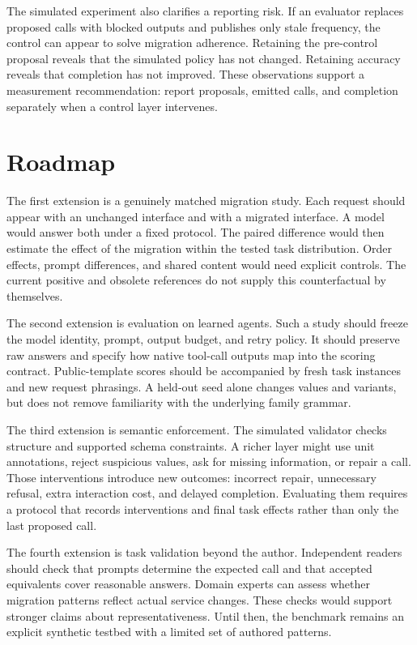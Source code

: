 \documentclass{article}
\begin{document}
The simulated experiment also clarifies a reporting risk. If an evaluator replaces proposed calls with blocked outputs and publishes only stale frequency, the control can appear to solve migration adherence. Retaining the pre-control proposal reveals that the simulated policy has not changed. Retaining accuracy reveals that completion has not improved. These observations support a measurement recommendation: report proposals, emitted calls, and completion separately when a control layer intervenes.\par
\section{Roadmap}
The first extension is a genuinely matched migration study. Each request should appear with an unchanged interface and with a migrated interface. A model would answer both under a fixed protocol. The paired difference would then estimate the effect of the migration within the tested task distribution. Order effects, prompt differences, and shared content would need explicit controls. The current positive and obsolete references do not supply this counterfactual by themselves.\par
The second extension is evaluation on learned agents. Such a study should freeze the model identity, prompt, output budget, and retry policy. It should preserve raw answers and specify how native tool-call outputs map into the scoring contract. Public-template scores should be accompanied by fresh task instances and new request phrasings. A held-out seed alone changes values and variants, but does not remove familiarity with the underlying family grammar.\par
The third extension is semantic enforcement. The simulated validator checks structure and supported schema constraints. A richer layer might use unit annotations, reject suspicious values, ask for missing information, or repair a call. Those interventions introduce new outcomes: incorrect repair, unnecessary refusal, extra interaction cost, and delayed completion. Evaluating them requires a protocol that records interventions and final task effects rather than only the last proposed call.\par
The fourth extension is task validation beyond the author. Independent readers should check that prompts determine the expected call and that accepted equivalents cover reasonable answers. Domain experts can assess whether migration patterns reflect actual service changes. These checks would support stronger claims about representativeness. Until then, the benchmark remains an explicit synthetic testbed with a limited set of authored patterns.\par
\end{document}
